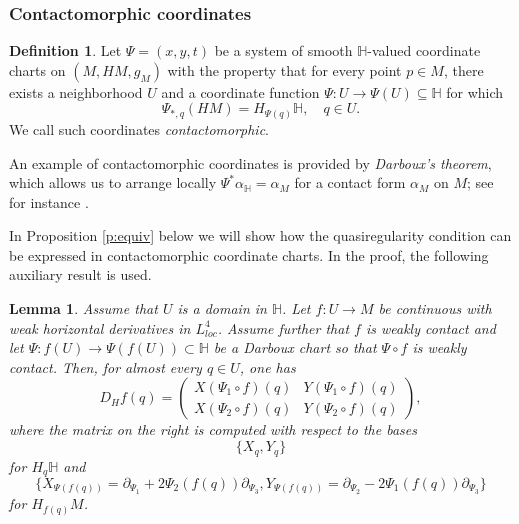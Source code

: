 \documentclass[10pt,letterpaper]{amsart}
\newtheorem{lemma}[thm]{Lemma}
\theoremstyle{definition}
\newtheorem{definition}[thm]{Definition}
\numberwithin{thm}{subsection}
\numberwithin{equation}{section}
\begin{document}
\subsubsection{Contactomorphic coordinates}

\begin{definition}
Let $\Psi=(x,y,t)$ be a system of smooth ${\mathbb H}$-valued coordinate charts on $(M,HM,g_M)$ with the property that for every point $p\in M$, there exists a neighborhood $U$ and a coordinate function $\Psi:U \to \Psi(U)\subseteq {\mathbb H}$ for which
$$\Psi_{\ast,q}(HM)=H_{\Psi(q)}{\mathbb H},\quad q\in U.$$ We call such coordinates \emph{contactomorphic}.
 \end{definition}

An example of contactomorphic coordinates is provided by
\emph{Darboux's theorem}, which allows us to arrange locally
$\Psi^{\ast} \alpha_{\mathbb H}= \alpha_M$ for a contact form
$\alpha_M$ on $M$; see for instance \cite[Theorem 3.1]{MR2682326}.

In Proposition \ref{p:equiv} below we will show how the
quasiregularity condition can be expressed in contactomorphic
coordinate charts. In the proof, the
following auxiliary result is used.

\begin{lemma}\label{eq:D_Hf_in_coord}
Assume that $U$ is a domain in ${\mathbb H}$. Let $f:U \to M$ be continuous with weak horizontal derivatives in $L_{loc}^4$. Assume further that $f$ is weakly contact and let $\Psi:f(U) \to \Psi(f(U))\subset {\mathbb H}$ be a Darboux chart so that $\Psi \circ f$ is weakly contact. Then, for almost every $q\in U$, one has
\begin{equation}\label{eq:Df_in_Psi}
 D_H f(q) = \begin{pmatrix}X(\Psi_1 \circ f)(q) & Y(\Psi_1 \circ f)(q)\\X(\Psi_2 \circ f)(q) & Y(\Psi_2 \circ f)(q)\end{pmatrix},
\end{equation}
where the matrix on the right is computed with respect to the bases
\begin{equation}\label{eq:basis1}
\{X_q,Y_q\}
\end{equation}
for $H_q{\mathbb H}$ and
\begin{equation}\label{eq:bases2}
\{X_{\Psi(f(q))}=\partial_{\Psi_1}+ 2
\Psi_2(f(q))\partial_{\Psi_3}, Y_{\Psi(f(q))}=\partial_{\Psi_2}- 2
\Psi_1(f(q))\partial_{\Psi_3}\}
\end{equation}
for $H_{f(q)}M$.
\end{lemma}
\end{document}
